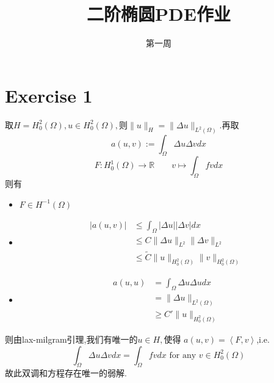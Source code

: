 \documentclass{ctexart}
\numberwithin{equation}{section}
\theoremstyle{plain}
\theoremstyle{plain}
\numberwithin{equation}{section}
\theoremstyle{remark}
\begin{document}
\date{}

\title
{二阶椭圆PDE作业}


\author{第一周}
\maketitle










\section{Exercise 1}
取$H=H_0^2(\Omega), u \in H_0^2(\Omega),$则$\lVert u \rVert_{H}=\lVert \Delta u \rVert_{L^2(\Omega)}$.再取
$$a(u,v):=\int_{\Omega} \Delta u \Delta v dx$$
$$F:H_0^1(\Omega)\longrightarrow \mathbb{R} \qquad v \longmapsto \int_{\Omega}fvdx$$
  则有
  \begin{itemize}
  	\item $F \in H^{-1}(\Omega)$
  	\item \begin{equation*}
  		\begin{aligned}
  			|a(u,v)| &\leqslant \int_{\Omega} |\Delta u||\Delta v| dx\\
  			&\leqslant C \lVert\Delta u\rVert_{L^2}\lVert\Delta v\rVert_{L^2}\\
  			&\leqslant \tilde{C} \lVert u\rVert_{H_0^2(\Omega)}\lVert v\rVert_{H_0^2(\Omega)}
  		\end{aligned}
  	\end{equation*}
  	  	\item \begin{equation*}
  	\begin{aligned}
  	a(u,u) &=\int_{\Omega} \Delta u \Delta u dx\\
  	&= \lVert\Delta u\rVert_{L^2(\Omega)}\\
  	&\geqslant C'\lVert u\rVert_{H_0^2(\Omega)}
  	\end{aligned}
  	\end{equation*}
  \end{itemize}
则由lax-milgram引理,我们有唯一的$u \in H,$使得
$a(u,v)=\left<F,v\right>$,i.e.
$$\int_{\Omega} \Delta u \Delta v dx=\int_{\Omega}fvdx \text{ for any } v \in H_0^2(\Omega)$$
故此双调和方程存在唯一的弱解.
\end{document}
